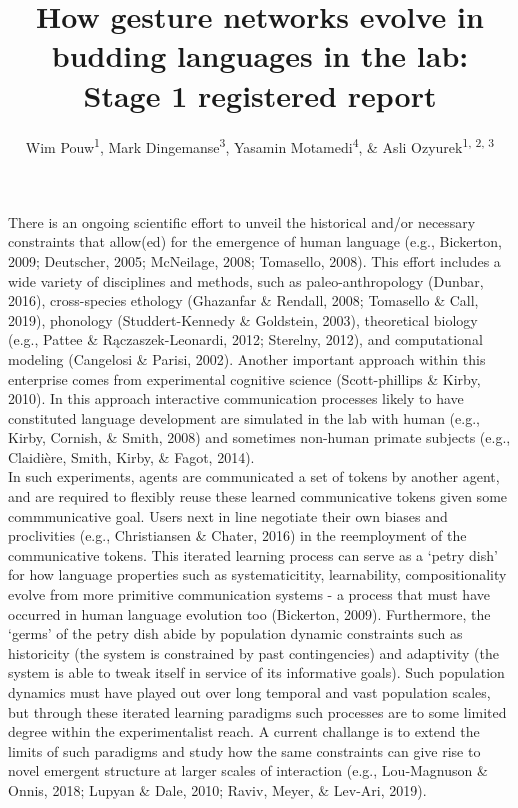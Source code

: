 \documentclass[
  man, noextraspace,floatsintext]{apa6}
\affiliation{
\vspace{0.5cm}
\textsuperscript{1} Donders Institute for Brain, Cognition and Behaviour, Radboud University Nijmegen\\\textsuperscript{2} Institute for Psycholinguistics, Max Planck Nijmegen\\\textsuperscript{3} Center for Language Studies, Radboud University Nijmegen \\\textsuperscript{4} Language and Cognition Lab, University College London}
\title{How gesture networks evolve in budding languages in the lab: Stage 1 registered report}
\author{Wim Pouw\textsuperscript{1}, Mark Dingemanse\textsuperscript{3}, Yasamin Motamedi\textsuperscript{4}, \& Asli Ozyurek\textsuperscript{1, 2, 3}}
\date{}
\begin{document}
\maketitle

There is an ongoing scientific effort to unveil the historical and/or necessary constraints that allow(ed) for the emergence of human language (e.g., Bickerton, 2009; Deutscher, 2005; McNeilage, 2008; Tomasello, 2008). This effort includes a wide variety of disciplines and methods, such as paleo-anthropology (Dunbar, 2016), cross-species ethology (Ghazanfar \& Rendall, 2008; Tomasello \& Call, 2019), phonology (Studdert-Kennedy \& Goldstein, 2003), theoretical biology (e.g., Pattee \& Rączaszek-Leonardi, 2012; Sterelny, 2012), and computational modeling (Cangelosi \& Parisi, 2002). Another important approach within this enterprise comes from experimental cognitive science (Scott-phillips \& Kirby, 2010). In this approach interactive communication processes likely to have constituted language development are simulated in the lab with human (e.g., Kirby, Cornish, \& Smith, 2008) and sometimes non-human primate subjects (e.g., Claidière, Smith, Kirby, \& Fagot, 2014).\\
In such experiments, agents are communicated a set of tokens by another agent, and are required to flexibly reuse these learned communicative tokens given some commmunicative goal. Users next in line negotiate their own biases and proclivities (e.g., Christiansen \& Chater, 2016) in the reemployment of the communicative tokens. This iterated learning process can serve as a `petry dish' for how language properties such as systematicitity, learnability, compositionality evolve from more primitive communication systems - a process that must have occurred in human language evolution too (Bickerton, 2009). Furthermore, the `germs' of the petry dish abide by population dynamic constraints such as historicity (the system is constrained by past contingencies) and adaptivity (the system is able to tweak itself in service of its informative goals). Such population dynamics must have played out over long temporal and vast population scales, but through these iterated learning paradigms such processes are to some limited degree within the experimentalist reach. A current challange is to extend the limits of such paradigms and study how the same constraints can give rise to novel emergent structure at larger scales of interaction (e.g., Lou‐Magnuson \& Onnis, 2018; Lupyan \& Dale, 2010; Raviv, Meyer, \& Lev-Ari, 2019).\\
\end{document}
